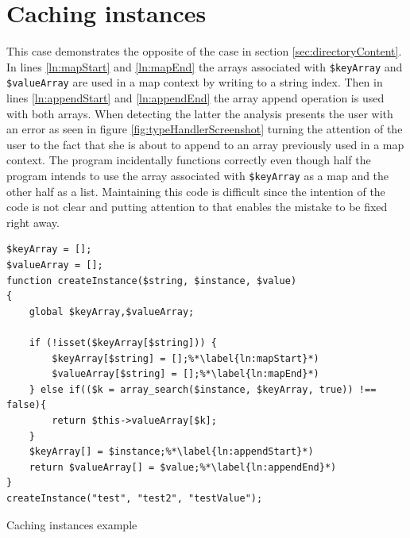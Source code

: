 \section{Caching instances}
This case demonstrates the opposite of the case in section \ref{sec:directoryContent}. In lines \ref{ln:mapStart} and \ref{ln:mapEnd} the arrays associated with \texttt{\$keyArray} and \texttt{\$valueArray} are used in a map context by writing to a string index. Then in lines \ref{ln:appendStart} and \ref{ln:appendEnd} the array append operation is used with both arrays. When detecting the latter the analysis presents the user with an error as seen in figure \ref{fig:typeHandlerScreenshot} turning the attention of the user to the fact that she is about to append to an array previously used in a map context. The program incidentally functions correctly even though half the program intends to use the array associated with \texttt{\$keyArray} as a map and the other half as a list. Maintaining this code is difficult since the intention of the code is not clear and putting attention to that enables the mistake to be fixed right away.

\begin{program}
\begin{lstlisting}
$keyArray = [];
$valueArray = [];
function createInstance($string, $instance, $value)
{
    global $keyArray,$valueArray;

    if (!isset($keyArray[$string])) { 
        $keyArray[$string] = [];%*\label{ln:mapStart}*)
        $valueArray[$string] = [];%*\label{ln:mapEnd}*)
    } else if(($k = array_search($instance, $keyArray, true)) !== false){
        return $this->valueArray[$k];
    }
    $keyArray[] = $instance;%*\label{ln:appendStart}*)
    return $valueArray[] = $value;%*\label{ln:appendEnd}*)
}
createInstance("test", "test2", "testValue");
\end{lstlisting}
\caption{Caching instances example}
\label{lst:typeHandler}
\end{program}

